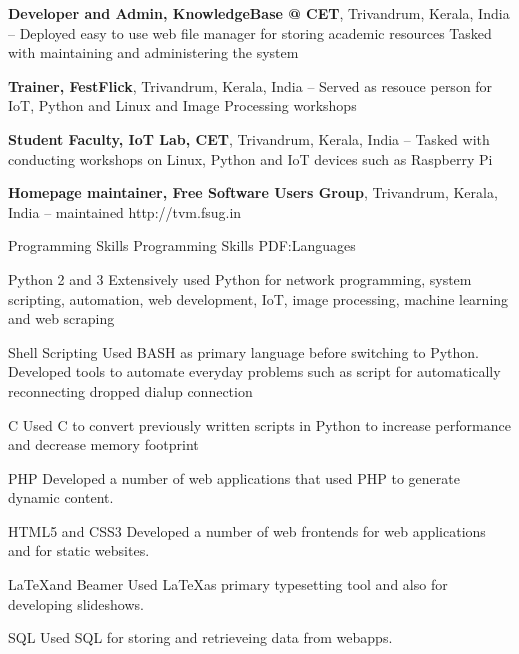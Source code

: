 \documentclass[letterpaper,MMMyyyy,nonstopmode]{simpleresumecv}
\begin{document}
\begin{Body}
\BigGap
\Entry
{\textbf{Developer and Admin, KnowledgeBase @ CET}},
Trivandrum, Kerala, India
\hfill
{} -- 
\Gap
\BulletItem
Deployed easy to use web file manager for storing academic resources 
\BulletItem
Tasked with maintaining and administering the system

\BigGap
\Entry
{\textbf{Trainer, FestFlick}},
Trivandrum, Kerala, India
\hfill
{} -- 
\Gap
\BulletItem
Served as resouce person for IoT, Python and Linux and Image Processing
workshops

\BigGap
\Entry
{\textbf{Student Faculty, IoT Lab, CET}},
Trivandrum, Kerala, India
\hfill
{} -- 
\Gap
\BulletItem
Tasked with conducting workshops on Linux, Python and IoT devices such as
Raspberry Pi

\BigGap
\Entry
{\textbf{Homepage maintainer, Free Software Users Group}},
Trivandrum, Kerala, India
\hfill
{} -- 
\Gap
\BulletItem
maintained http://tvm.fsug.in


\Section
{Programming Skills}
{Programming Skills}
{PDF:Languages}

\BulletItem
Python 2 and 3
\SubBulletItem
Extensively used Python for network programming, system scripting, automation,
web development, IoT, image processing, machine learning and web scraping

\BigGap
\BulletItem
Shell Scripting
\SubBulletItem
Used BASH as primary language before switching to Python. Developed tools to
automate everyday problems such as script for automatically reconnecting dropped
dialup connection

\BigGap
\BulletItem
C
\SubBulletItem
Used C to convert previously written scripts in Python to increase performance
and decrease memory footprint

\BigGap
\BulletItem
PHP
\SubBulletItem
Developed a number of web applications that used PHP to generate dynamic
content.

\BigGap
\BulletItem
HTML5 and CSS3
\SubBulletItem
Developed a number of web frontends for web applications and for static
websites.

\BigGap
\BulletItem
\LaTeX and Beamer
\SubBulletItem
Used \LaTeX as primary typesetting tool and also for developing slideshows.

\BigGap
\BulletItem
SQL
\SubBulletItem
Used SQL for storing and retrieveing data from webapps.



\end{Body}
\end{document}

